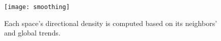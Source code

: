 \begin{figure}[tb]
	\centering
	\texttt{[image: smoothing]}
	\caption{Each space's directional density is computed based on its neighbors' and global trends. }
	\label{fig:smoothing}
\end{figure}

%
%

















